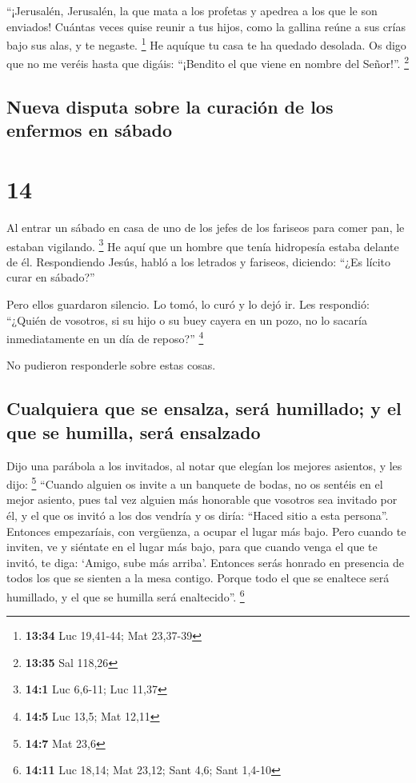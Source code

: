  ``¡Jerusalén, Jerusalén, la que mata a los profetas y
apedrea a los que le son enviados! Cuántas veces quise reunir a tus
hijos, como la gallina reúne a sus crías bajo sus alas, y te negaste.
\footnote{\textbf{13:34} Luc 19,41-44; Mat 23,37-39}  He
aquíque tu casa te ha quedado desolada. Os digo que no me veréis hasta
que digáis: ``¡Bendito el que viene en nombre del Señor!''. \footnote{\textbf{13:35}
  Sal 118,26}

\hypertarget{nueva-disputa-sobre-la-curaciuxf3n-de-los-enfermos-en-suxe1bado}{%
\subsection{Nueva disputa sobre la curación de los enfermos en
sábado}\label{nueva-disputa-sobre-la-curaciuxf3n-de-los-enfermos-en-suxe1bado}}

\hypertarget{section-13}{%
\section{14}\label{section-13}}

 Al entrar un sábado en casa de uno de los jefes de los
fariseos para comer pan, le estaban vigilando. \footnote{\textbf{14:1}
  Luc 6,6-11; Luc 11,37}  He aquí que un hombre que tenía
hidropesía estaba delante de él.  Respondiendo Jesús,
habló a los letrados y fariseos, diciendo: ``¿Es lícito curar en
sábado?''

 Pero ellos guardaron silencio. Lo tomó, lo curó y lo dejó
ir.  Les respondió: ``¿Quién de vosotros, si su hijo o su
buey cayera en un pozo, no lo sacaría inmediatamente en un día de
reposo?'' \footnote{\textbf{14:5} Luc 13,5; Mat 12,11}

 No pudieron responderle sobre estas cosas.

\hypertarget{cualquiera-que-se-ensalza-seruxe1-humillado-y-el-que-se-humilla-seruxe1-ensalzado}{%
\subsection{Cualquiera que se ensalza, será humillado; y el que se
humilla, será
ensalzado}\label{cualquiera-que-se-ensalza-seruxe1-humillado-y-el-que-se-humilla-seruxe1-ensalzado}}

 Dijo una parábola a los invitados, al notar que elegían
los mejores asientos, y les dijo: \footnote{\textbf{14:7} Mat 23,6}
 ``Cuando alguien os invite a un banquete de bodas, no os
sentéis en el mejor asiento, pues tal vez alguien más honorable que
vosotros sea invitado por él,  y el que os invitó a los
dos vendría y os diría: ``Haced sitio a esta persona''. Entonces
empezaríais, con vergüenza, a ocupar el lugar más bajo. 
Pero cuando te inviten, ve y siéntate en el lugar más bajo, para que
cuando venga el que te invitó, te diga: `Amigo, sube más arriba'.
Entonces serás honrado en presencia de todos los que se sienten a la
mesa contigo.  Porque todo el que se enaltece será
humillado, y el que se humilla será enaltecido''. \footnote{\textbf{14:11}
  Luc 18,14; Mat 23,12; Sant 4,6; Sant 1,4-10}

